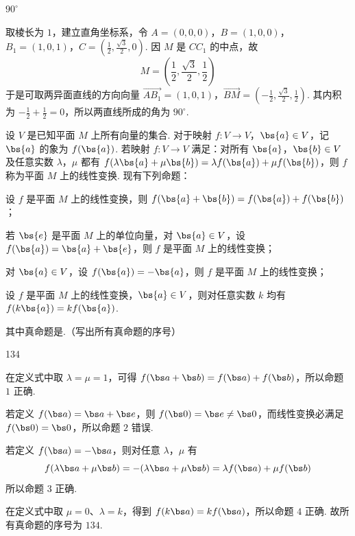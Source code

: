 \begin{answer}
\(90^{\circ}\)
\end{answer}

\begin{solution}
取棱长为 \(1\)，建立直角坐标系，令
\(A=(0,0,0)\)，\(B=(1,0,0)\)，\(B_1=(1,0,1)\)，\(C=\left(\frac12,\frac{\sqrt3}{2},0\right)\).
因 \(M\) 是 \(CC_1\) 的中点，故
\[
M=\left(\frac12,\frac{\sqrt3}{2},\frac12\right)
\]
于是可取两异面直线的方向向量
\(\overrightarrow{AB_1}=(1,0,1)\)，\(\overrightarrow{BM}=\left(-\frac12,\frac{\sqrt3}{2},\frac12\right)\).
其内积为 \(-\frac12+\frac12=0\)，所以两直线所成的角为 \(90^{\circ}\).
\end{solution}

\begin{problem}
设 \(V\) 是已知平面 \(M\) 上所有向量的集合. 对于映射 \(f: V \to V\)，\(\bs{a} \in V\)，记 \(\bs{a}\) 的象为 \(f(\bs{a})\). 若映射 \(f: V \to V\) 满足：对所有 \(\bs{a}\)，\(\bs{b} \in V\) 及任意实数 \(\lambda\)，\(\mu\) 都有 \(f(\lambda\bs{a} + \mu\bs{b}) = \lambda f(\bs{a}) + \mu f(\bs{b})\)，则 \(f\) 称为平面 \(M\) 上的线性变换. 现有下列命题：

\begin{circlelist}
\item 设 \(f\) 是平面 \(M\) 上的线性变换，则 \(f(\bs{a}+\bs{b}) = f(\bs{a}) + f(\bs{b})\)；
\item 若 \(\bs{e}\) 是平面 \(M\) 上的单位向量，对 \(\bs{a} \in V\)，设 \(f(\bs{a}) = \bs{a} + \bs{e}\)，则 \(f\) 是平面 \(M\) 上的线性变换；
\item 对 \(\bs{a} \in V\)，设 \(f(\bs{a}) = -\bs{a}\)，则 \(f\) 是平面 \(M\) 上的线性变换；
\item 设 \(f\) 是平面 \(M\) 上的线性变换，\(\bs{a} \in V\)，则对任意实数 \(k\) 均有 \(f(k\bs{a}) = kf(\bs{a})\).
\end{circlelist}

其中真命题是\fillinblank{}.（写出所有真命题的序号）
\end{problem}

\begin{answer}
134
\end{answer}

\begin{solution}
在定义式中取 \(\lambda=\mu=1\)，可得
\(f(\bs a+\bs b)=f(\bs a)+f(\bs b)\)，所以命题 \(1\) 正确.

若定义 \(f(\bs a)=\bs a+\bs e\)，则 \(f(\bs0)=\bs e\ne\bs0\)，而线性变换必满足
\(f(\bs0)=\bs0\)，所以命题 \(2\) 错误.

若定义 \(f(\bs a)=-\bs a\)，则对任意 \(\lambda\)，\(\mu\) 有
\[
f(\lambda\bs a+\mu\bs b)=-(\lambda\bs a+\mu\bs b)
=\lambda f(\bs a)+\mu f(\bs b)
\]
所以命题 \(3\) 正确.

在定义式中取 \(\mu=0\)、\(\lambda=k\)，得到
\(f(k\bs a)=kf(\bs a)\)，所以命题 \(4\) 正确. 故所有真命题的序号为 \(134\).
\end{solution}

